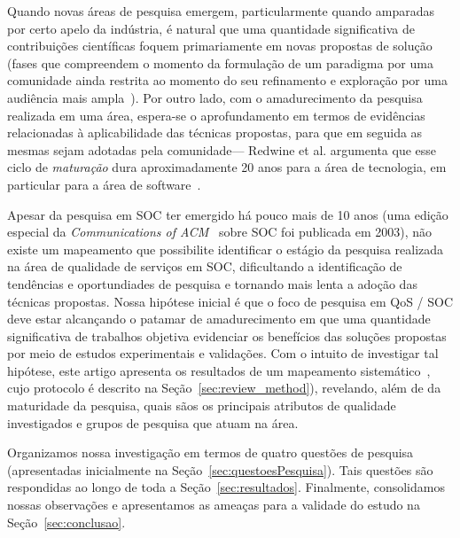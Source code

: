 Quando novas \'{a}reas de pesquisa emergem, particularmente quando amparadas por 
certo apelo da ind\'{u}stria, \'{e} natural que uma quantidade significativa de 
contribui\c c\~{o}es cient\'{i}ficas foquem primariamente em novas propostas de solu\c c\~{a}o 
(fases que compreendem o momento da formula\c c\~{a}o de um paradigma por uma comunidade ainda restrita 
ao momento do seu refinamento e explora\c c\~{a}o por uma audi\^{e}ncia mais ampla~\cite{redwine:icse1985}).   
Por outro lado, com o amadurecimento da pesquisa realizada em uma \'{a}rea, espera-se o aprofundamento 
em termos de evid\^{e}ncias relacionadas \`{a} aplicabilidade das t\'{e}cnicas propostas, para que em seguida as mesmas sejam adotadas pela comunidade--- Redwine et al. argumenta que 
esse ciclo de \emph{matura\c c\~{a}o} dura aproximadamente 20 anos para a \'{a}rea de tecnologia, em 
particular para a \'{a}rea de software~\cite{redwine:icse1985}.

Apesar da pesquisa em SOC ter emergido h\'{a} pouco mais de 10 anos 
(uma edi\c c\~{a}o especial da \emph{Communications of ACM}~\cite{papazoglou:cacm2003} sobre SOC foi publicada em 2003), n\~{a}o existe um mapeamento que possibilite identificar o est\'{a}gio da pesquisa realizada na \'{a}rea de qualidade de servi\c cos em SOC, dificultando a identifica\c c\~{a}o de tend\^{e}ncias e oportundiades de pesquisa e tornando mais lenta a ado\c c\~{a}o das t\'{e}cnicas propostas. Nossa hip\'{o}tese inicial \'{e} que o foco de pesquisa em QoS / SOC deve estar alcan\c cando o patamar de amadurecimento em que uma quantidade significativa de trabalhos objetiva evidenciar os benef\'{i}cios das solu\c c\~{o}es propostas por meio de estudos experimentais e valida\c c\~{o}es. Com o intuito de investigar tal hip\'{o}tese, este artigo apresenta os resultados de um mapeamento sistem\'{a}tico~\cite{Petersen_Feldt_Mujtaba_Mattsson_2007}, cujo protocolo \'{e} descrito na Se\c c\~{a}o~\ref{sec:review_method}), revelando, al\'{e}m de da maturidade da pesquisa, quais s\~{a}os os principais atributos de qualidade investigados e grupos de pesquisa que atuam na \'{a}rea. 

Organizamos nossa investiga\c{c}\~{a}o em termos de quatro quest\~{o}es de pesquisa (apresentadas inicialmente na Se\c c\~{a}o~\ref{sec:questoesPesquisa}). Tais quest\~{o}es s\~{a}o respondidas ao longo de toda a Se\c c\~{a}o~\ref{sec:resultados}. Finalmente, consolidamos nossas observa\c c\~{o}es e apresentamos as amea\c cas para a validade do estudo na Se\c c\~{a}o~\ref{sec:conclusao}. 


